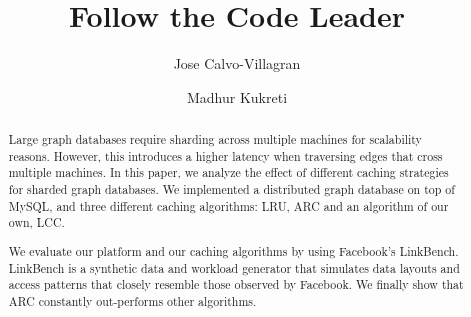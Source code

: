 \documentclass{acm_proc_article-sp}
\begin{document}
\title{Follow the Code Leader}
\author{
\alignauthor
Jose Calvo-Villagran
\and
\alignauthor
Madhur Kukreti
}

\maketitle

\begin{abstract}
Large graph databases require sharding across multiple machines for scalability
reasons. However, this introduces a higher latency when traversing edges that
cross multiple machines. In this paper, we analyze the effect of different caching
strategies for sharded graph databases. We implemented a distributed graph
database on top of MySQL, and three different caching algorithms: LRU, ARC and
an algorithm of our own, LCC.

We evaluate our platform and our caching algorithms by using Facebook's LinkBench.
LinkBench is a synthetic data and workload generator that simulates data layouts and
access patterns that closely resemble those observed by Facebook. We finally show
that ARC constantly out-performs other algorithms.

\end{abstract}














\end{document}
